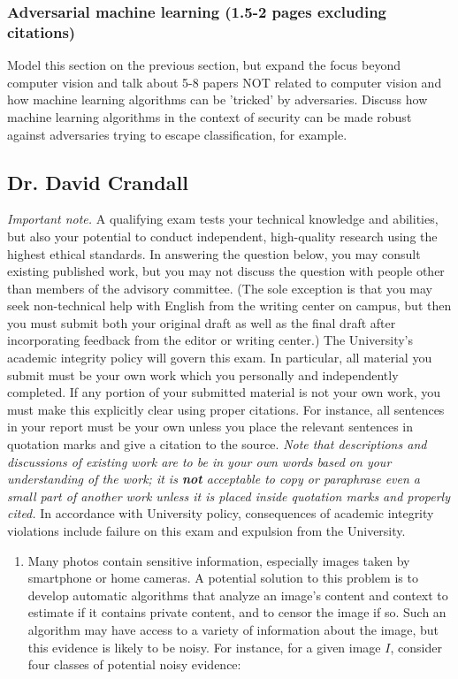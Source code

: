 \documentclass[11pt]{article}
\begin{document}
\begin{appendices}
\subsubsection{Adversarial machine learning (1.5-2 pages excluding citations)}
Model this section on the previous section, but expand the focus beyond computer vision and talk about 5-8 papers NOT related to computer vision and how machine learning algorithms can be 'tricked' by adversaries. Discuss how machine learning algorithms in the context of security can be made robust against adversaries trying to escape classification, for example.

\subsection{Dr. David Crandall}\label{app:questions}

\textit{Important note.}  A qualifying exam tests your technical
knowledge and abilities, but also your potential to conduct
independent, high-quality research using  the highest ethical standards.
In answering the question below, you may consult existing
published work, but you may not discuss the question with people other than
members of the advisory committee.  (The sole exception is that you
may seek non-technical help with English from the writing center on
campus, but then you must submit both your original draft as well as
the final draft after incorporating feedback from the editor or
writing center.)  The University's academic integrity policy will
govern this exam. In particular, all material you submit
must be your own work which you
personally and independently completed. If any portion of your
submitted material is not your own work, you must make this explicitly
clear using proper citations. For instance, all sentences in your
report must be your own unless you place the relevant sentences in
quotation marks and give a citation to the source.  \textit{Note that
  descriptions and discussions of existing work are to be in your own
  words based on your understanding of the work; it is \textbf{not}
  acceptable to copy or paraphrase even a small part of another work
  unless it is placed inside quotation marks and properly cited.}
{In accordance with University policy, consequences of academic
  integrity violations  include failure on this exam and expulsion
  from the University.}


\vspace{-12pt}
\begin{enumerate}
\item
Many photos contain sensitive information, especially images
  taken by smartphone or home cameras. A potential solution to
  this problem is to develop automatic algorithms that analyze an
  image's content and context to estimate if it contains private
  content, and to censor the image if so.  Such an  algorithm
  may have access to a variety of information about the image, but
  this evidence is likely to be noisy. For instance, for a given
  image $I$, consider four classes of potential noisy evidence:


\end{enumerate}
\end{appendices}
\end{document}
